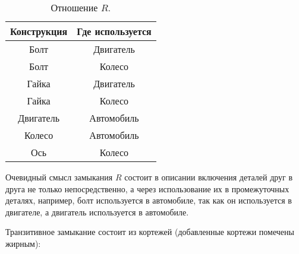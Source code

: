 \documentclass[12pt]{matmex-diploma}
\begin{document}
            \begin{table}[htb]
                \centering
                \begin{tabular}{|c|c|}
                    \hline
                    \textbf{Конструкция} & \textbf{Где используется} \\ \hline
                    Болт                 & Двигатель                 \\ \hline
                    Болт                 & Колесо                    \\ \hline
                    Гайка                & Двигатель                 \\ \hline
                    Гайка                & Колесо                    \\ \hline
                    Двигатель            & Автомобиль                \\ \hline
                    Колесо               & Автомобиль                \\ \hline
                    Ось                  & Колесо                    \\ \hline
                \end{tabular}
                \caption{Отношение $R$.}
            \end{table}

            Очевидный смысл замыкания $R$ состоит в описании включения деталей друг в друга не только непосредственно, а через использование их в промежуточных деталях, например, болт используется в автомобиле, так как он используется в двигателе, а двигатель используется в автомобиле.
            
            Транзитивное замыкание состоит из кортежей (добавленные кортежи помечены жирным):
\end{document}
